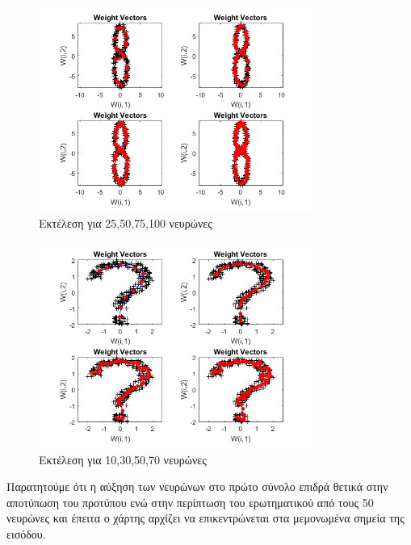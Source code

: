 \documentclass[12pt]{article}
\begin{document}
		\begin{figure}[H]
	 		\centering
			\includegraphics[width=0.8\textwidth]{fakelos/Eight_multinodes.png}
			\caption{Εκτέλεση για 25,50,75,100 νευρώνες} 	  
			\label{fig:2}
		\end{figure} 		 				
		\begin{figure}[H]
	 		\centering
			\includegraphics[width=0.8\textwidth]{fakelos/Question_multiplynodes.png}
			\caption{Εκτέλεση για 10,30,50,70 νευρώνες} 	  
			\label{fig:2}
		\end{figure} 		 			

Παρατητούμε ότι η αύξηση των νευρώνων στο πρώτο σύνολο επιδρά θετικά στην αποτύπωση του προτύπου ενώ στην περίπτωση του ερωτηματικού από τους 50 νευρώνες και έπειτα ο χάρτης αρχίζει να επικεντρώνεται στα μεμονωμένα σημεία της εισόδου.\\	
\end{document}
